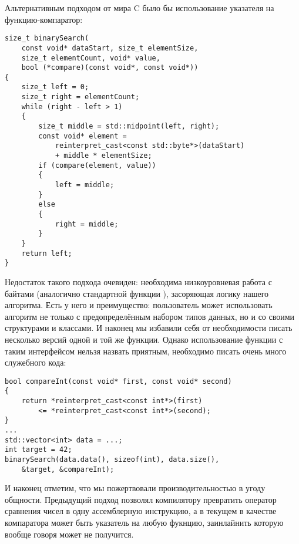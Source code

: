 Альтернативным подходом от мира C было бы использование указателя на функцию-компаратор:
\begin{verbatim}
size_t binarySearch(
    const void* dataStart, size_t elementSize,
    size_t elementCount, void* value,
    bool (*compare)(const void*, const void*))
{
    size_t left = 0;
    size_t right = elementCount;
    while (right - left > 1)
    {
        size_t middle = std::midpoint(left, right);
        const void* element =
            reinterpret_cast<const std::byte*>(dataStart)
            + middle * elementSize;
        if (compare(element, value))
        {
            left = middle;
        }
        else
        {
            right = middle;
        }
    }
    return left;
}
\end{verbatim}
Недостаток такого подхода очевиден: необходима низкоуровневая работа с байтами (аналогично стандартной функции ), засоряющая логику нашего алгоритма. Есть у него и преимущество: пользователь может использовать алгоритм не только с предопределённым набором типов данных, но и со своими структурами и классами. И наконец мы избавили себя от необходимости писать несколько версий одной и той же функции. Однако использование функции с таким интерфейсом нельзя назвать приятным, необходимо писать очень много служебного кода:
\begin{verbatim}
bool compareInt(const void* first, const void* second)
{
    return *reinterpret_cast<const int*>(first)
        <= *reinterpret_cast<const int*>(second);
}
...
std::vector<int> data = ...;
int target = 42;
binarySearch(data.data(), sizeof(int), data.size(),
    &target, &compareInt);
\end{verbatim}
И наконец отметим, что мы пожертвовали производительностью в угоду общности. Предыдущий подход позволял компилятору превратить оператор сравнения чисел в одну ассемблерную инструкцию, а в текущем в качестве компаратора может быть указатель на любую фукнцию, заинлайнить которую вообще говоря может не получится.

